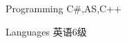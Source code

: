 


\begin{cvskills}


\cvskill
{Programming} %
{C\#,AS,C++} %




\cvskill
{Languages} %
{英语6级} %


\end{cvskills}
